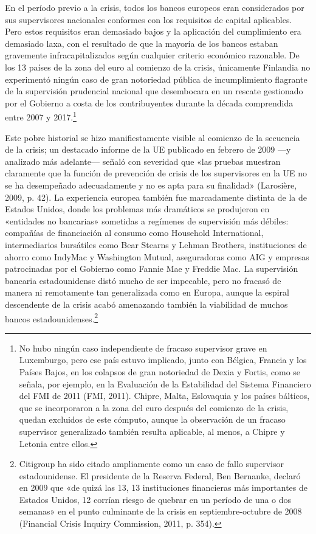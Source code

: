 \documentclass[10pt,a4paper]{article}
\begin{document}
{En el período previo a la crisis, todos los bancos europeos eran considerados por sus supervisores nacionales conformes con los requisitos de capital aplicables. Pero estos requisitos eran demasiado bajos y la aplicación del cumplimiento era demasiado laxa, con el resultado de que la mayoría de los bancos estaban gravemente infracapitalizados según cualquier criterio económico razonable. De los 13 países de la zona del euro al comienzo de la crisis, únicamente Finlandia no experimentó ningún caso de gran notoriedad pública de incumplimiento flagrante de la supervisión prudencial nacional que desembocara en un rescate gestionado por el Gobierno a costa de los contribuyentes durante la década comprendida entre 2007 y 2017.\footnote{%
    No hubo ningún caso independiente de fracaso supervisor grave en Luxemburgo, pero ese país estuvo implicado, junto con Bélgica, Francia y los Países Bajos, en los colapsos de gran notoriedad de Dexia y Fortis, como se señala, por ejemplo, en la Evaluación de la Estabilidad del Sistema Financiero del FMI de 2011 (FMI, 2011). Chipre, Malta, Eslovaquia y los países bálticos, que se incorporaron a la zona del euro después del comienzo de la crisis, quedan excluidos de este cómputo, aunque la observación de un fracaso supervisor generalizado también resulta aplicable, al menos, a Chipre y Letonia entre ellos.
}

Este pobre historial se hizo manifiestamente visible al comienzo de la secuencia de la crisis; un destacado informe de la UE publicado en febrero de 2009 —y analizado más adelante— señaló con severidad que «las pruebas muestran claramente que la función de prevención de crisis de los supervisores en la UE no se ha desempeñado adecuadamente y no es apta para su finalidad» (Larosière, 2009, p. 42). La experiencia europea también fue marcadamente distinta de la de Estados Unidos, donde los problemas más dramáticos se produjeron en «entidades no bancarias» sometidas a regímenes de supervisión más débiles: compañías de financiación al consumo como Household International, intermediarios bursátiles como Bear Stearns y Lehman Brothers, instituciones de ahorro como IndyMac y Washington Mutual, aseguradoras como AIG y empresas patrocinadas por el Gobierno como Fannie Mae y Freddie Mac. La supervisión bancaria estadounidense distó mucho de ser impecable, pero no fracasó de manera ni remotamente tan generalizada como en Europa, aunque la espiral descendente de la crisis acabó amenazando también la viabilidad de muchos bancos estadounidenses.\footnote{%
    Citigroup ha sido citado ampliamente como un caso de fallo supervisor estadounidense. El presidente de la Reserva Federal, Ben Bernanke, declaró en 2009 que «de quizá las 13, 13 instituciones financieras más importantes de Estados Unidos, 12 corrían riesgo de quebrar en un período de una o dos semanas» en el punto culminante de la crisis en septiembre-octubre de 2008 (Financial Crisis Inquiry Commission, 2011, p. 354).
}

}
\end{document}
